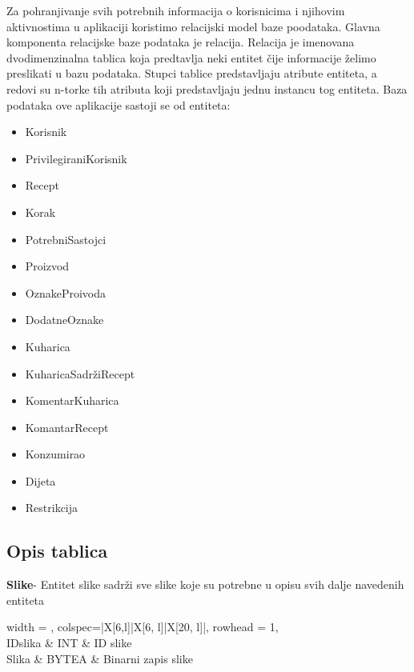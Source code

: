 			
Za pohranjivanje svih potrebnih informacija o korisnicima i njihovim aktivnostima u aplikaciji koristimo relacijski model baze poodataka. Glavna komponenta relacijske baze podataka je relacija. Relacija je imenovana dvodimenzinalna tablica koja predtavlja neki entitet čije informacije želimo preslikati u bazu podataka. Stupci tablice predstavljaju atribute entiteta, a redovi su n-torke tih atributa koji predstavljaju jednu instancu tog entiteta. Baza podataka ove aplikacije sastoji se od entiteta:
\begin{itemize}
\item Korisnik
\item PrivilegiraniKorisnik
\item Recept
\item Korak
\item PotrebniSastojci
\item Proizvod
\item OznakeProivoda
\item DodatneOznake
\item Kuharica
\item KuharicaSadržiRecept
\item KomentarKuharica
\item KomantarRecept
\item Konzumirao
\item Dijeta
\item Restrikcija
\end{itemize}

			\subsection{Opis tablica}
			

		
				
\textbf{Slike}- Entitet slike sadrži sve slike koje su potrebne u opisu svih dalje navedenih entiteta
\begin{longtblr}[
					label=none,
					entry=none
					]{
						width = \textwidth,
						colspec={|X[6,l]|X[6, l]|X[20, l]|}, 
						rowhead = 1,
					}
					\hline {} \\ \hline[3pt]
					IDslika & INT & ID slike \\ \hline
					Slika & BYTEA & Binarni zapis slike \\ \hline
				\end{longtblr}

